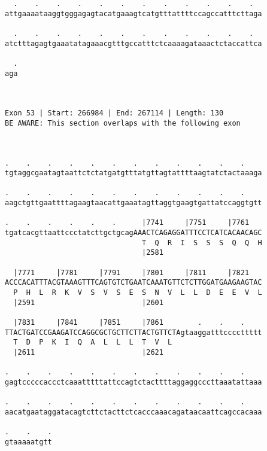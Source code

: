 \documentclass{article}
\begin{document}
\begin{Verbatim}
  .    .    .    .    .    .    .    .    .    .    .    .  
attgaaaataaggtgggagagtacatgaaagtcatgtttattttccagccatttcttaga
                                                            
  .    .    .    .    .    .    .    .    .    .    .    .  
atctttagagtgaaatatagaaacgtttgccatttctcaaaagataaactctaccattca
                                                            
  .
aga
   
   
 
Exon 53 | Start: 266984 | End: 267114 | Length: 130
BE AWARE: This section overlaps with the following exon



.    .    .    .    .    .    .    .    .    .    .    .    
tgtaggcgaatagtaattctctatgatgtttatgttagtattttaagtatctactaaaga
                                                            
.    .    .    .    .    .    .    .    .    .    .    .    
aagctgttgaattttagaagtaacattgaaatagttaggtgaagtgattatccaggtgtt
                                                            
.    .    .    .    .    .      |7741     |7751     |7761   
tgatcacgttaattccctatcttgctgcagAAACTCAGAGGATTTCCTCATCACAACAGC
                                T  Q  R  I  S  S  S  Q  Q  H
                                |2581                       
  
  |7771     |7781     |7791     |7801     |7811     |7821   
ACCCACATTTACGTAAAGTTTCAGTGTCTGAATCAAATGTTCTCTTGGATGAAGAAGTAC
  P  H  L  R  K  V  S  V  S  E  S  N  V  L  L  D  E  E  V  L
  |2591                         |2601                       
  
  |7831     |7841     |7851     |7861        .    .    .    
TTACTGATCCGAAGATCCAGGCGCTGCTTCTTACTGTTCTAgtaaggatttccccttttt
  T  D  P  K  I  Q  A  L  L  L  T  V  L                     
  |2611                         |2621                       
  
.    .    .    .    .    .    .    .    .    .    .    .    
gagtcccccaccctcaaatttttattccagtctacttttaggaggcccttaaatattaaa
                                                            
.    .    .    .    .    .    .    .    .    .    .    .    
aacatgaataggatacagtcttctacttctcacccaaacagataacaattcagccacaaa
                                                            
.    .    .
gtaaaaatgtt
           
           
 

\end{Verbatim}
\end{document}
